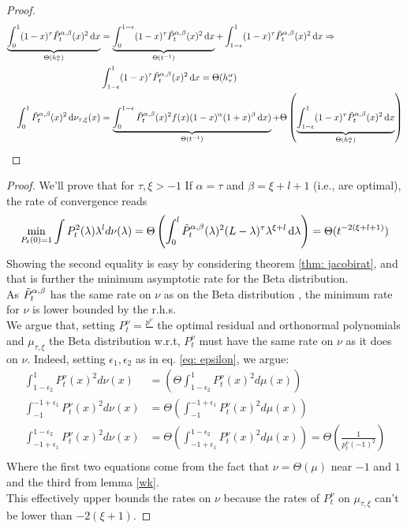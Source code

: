 \documentclass{article}
\begin{document}
\begin{proof}
\begin{align}
    \underbrace{\int_0^1(1-x)^\tau\Tilde{P}_t^{\alpha,\beta}(x)^2\mathop{}\!\mathrm{d} x}_{\Theta( h_\tau^\alpha)}&=\underbrace{\int_0^{1-\epsilon}(1-x)^\tau\Tilde{P}_t^{\alpha,\beta}(x)^2\mathop{}\!\mathrm{d} x}_{\Theta( t^{-1})
    } +\int_{1-\epsilon}^1(1-x)^\tau\Tilde{P}_t^{\alpha,\beta}(x)^2\mathop{}\!\mathrm{d} x \Rightarrow\\
    &\int_{1-\epsilon}^1(1-x)^\tau\Tilde{P}_t^{\alpha,\beta}(x)^2\mathop{}\!\mathrm{d} x  =\Theta( h_\tau^\alpha) \\
    \int_0^1 \Tilde{P}_t^{\alpha,\beta}(x)^2\mathop{}\!\mathrm{d}\nu_{\tau,\xi}(x)&=
    \underbrace{\int_0^{1-\epsilon} \Tilde{P}_t^{\alpha,\beta}(x)^2 f(x) (1-x)^\alpha(1+x)^\beta\mathop{}\!\mathrm{d} x)}_{\Theta( t^{-1})
    }+\Theta\left(
    \underbrace{\int_{1-\epsilon}^1(1-x)^\tau\Tilde{P}_t^{\alpha,\beta}(x)^2\mathop{}\!\mathrm{d} x}_{\Theta( h_\tau^\alpha)}\right)
\end{align}


\end{proof}

\jacoptimal*
\begin{proof}
We'll prove that for $\tau,\xi>-1$ If $\alpha = \tau$ and $\beta = \xi+l+1$ (i.e., are optimal), the rate of convergence reads
\begin{equation}
    \min_{P_t(0)=1}\int P_t^2(\lambda)\lambda^ld\nu(\lambda)=\Theta\left( \int_{0}^l  \Tilde{P}_t^{\alpha,\beta}(\lambda)^2(L-\lambda)^\tau\lambda^{\xi+l}\mathop{}\!\mathrm{d} \lambda\right) =\Theta( t^{-2(\xi+l+1)})
\end{equation}
Showing the second equality is easy by considering theorem \ref{thm: jacobirat}, and that is further the minimum asymptotic rate for the Beta distribution. \\
As $\Tilde{P}^{\alpha,\beta}_t$ has the same rate on $\nu$ as  on the Beta distribution , the minimum rate for $\nu$ is lower bounded by the r.h.s. \\
We argue that, setting $P^\nu_t=\frac{p^\nu}{}$ the optimal residual and orthonormal polynomials and $\mu_{\tau,\xi}$ the Beta distribution  w.r.t, $P^\nu_t$ must have the same rate on $\nu$ as it does on $\nu$. Indeed, setting $\epsilon_1,\epsilon_2$ as in eq. \ref{eq: epsilon}, we argue:
\begin{align}
    \int_{1-\epsilon_2}^{1}P_t^\nu(x)^2d\nu(x)&=\left(\Theta\int_{1-\epsilon_2}^{1}P_t^\nu(x)^2d\mu(x)\right)\\
    \int_{-1}^{-1+\epsilon_1}P_t^\nu(x)^2d\nu(x)&=\Theta\left(\int_{-1}^{-1+\epsilon_1}P_t^\nu(x)^2d\mu(x)\right)\\
    \int_{-1+\epsilon_1}^{1-\epsilon_2}P_t^\nu(x)^2d\nu(x)&=\Theta\left(\int_{-1+\epsilon_1}^{1-\epsilon_2}P_t^\nu(x)^2d\mu(x)\right)=\Theta\left(\frac{1}{p_t^\nu(-1)^2}\right)\\
\end{align}
Where the first two equations come from the fact that $\nu=\Theta(\mu)$ near $-1$ and $1$ and the third from lemma \ref{wk}.\\
This effectively upper bounds the rates on $\nu$ because the rates of $P_t^\nu$ on $\mu_{\tau,\xi}$ can't be lower than $-2(\xi+1)$.
\end{proof}
\end{document}
